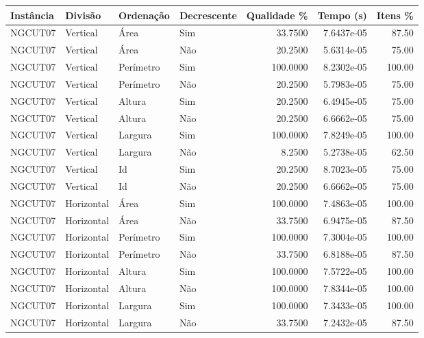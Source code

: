 \begin{tabular}{llllrrr}
    \hline
    Instância & Divisão     & Ordenação & Decrescente & Qualidade \% & Tempo (s)  & Itens \% \\
    \hline
    NGCUT07   & Vertical    & Área      & Sim         & 33.7500      & 7.6437e-05 & 87.50    \\
    NGCUT07   & Vertical    & Área      & Não         & 20.2500      & 5.6314e-05 & 75.00    \\
    NGCUT07   & Vertical    & Perímetro & Sim         & 100.0000     & 8.2302e-05 & 100.00   \\
    NGCUT07   & Vertical    & Perímetro & Não         & 20.2500      & 5.7983e-05 & 75.00    \\
    NGCUT07   & Vertical    & Altura    & Sim         & 20.2500      & 6.4945e-05 & 75.00    \\
    NGCUT07   & Vertical    & Altura    & Não         & 20.2500      & 6.6662e-05 & 75.00    \\
    NGCUT07   & Vertical    & Largura   & Sim         & 100.0000     & 7.8249e-05 & 100.00   \\
    NGCUT07   & Vertical    & Largura   & Não         & 8.2500       & 5.2738e-05 & 62.50    \\
    NGCUT07   & Vertical    & Id        & Sim         & 20.2500      & 8.7023e-05 & 75.00    \\
    NGCUT07   & Vertical    & Id        & Não         & 20.2500      & 6.6662e-05 & 75.00    \\
    NGCUT07   & Horizontal  & Área      & Sim         & 100.0000     & 7.4863e-05 & 100.00   \\
    NGCUT07   & Horizontal  & Área      & Não         & 33.7500      & 6.9475e-05 & 87.50    \\
    NGCUT07   & Horizontal  & Perímetro & Sim         & 100.0000     & 7.3004e-05 & 100.00   \\
    NGCUT07   & Horizontal  & Perímetro & Não         & 33.7500      & 6.8188e-05 & 87.50    \\
    NGCUT07   & Horizontal  & Altura    & Sim         & 100.0000     & 7.5722e-05 & 100.00   \\
    NGCUT07   & Horizontal  & Altura    & Não         & 100.0000     & 7.8344e-05 & 100.00   \\
    NGCUT07   & Horizontal  & Largura   & Sim         & 100.0000     & 7.3433e-05 & 100.00   \\
    NGCUT07   & Horizontal  & Largura   & Não         & 33.7500      & 7.2432e-05 & 87.50    \\

\end{tabular}
